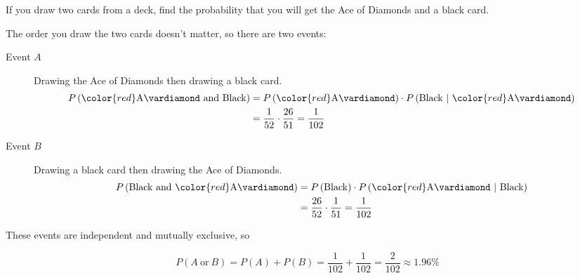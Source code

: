 \documentclass{beamer}
\newcommand{\suitdiamond}[1][]{{\color{red}\text{#1}\vardiamond}}
\newcommand{\prob}[1]{P\left(#1\right)}
\newcommand{\condprob}[2]{\prob{#1~\middle|~#2}}
\begin{document}
\begin{frame}
\begin{example}
If you draw two cards from a deck, find the probability that you will get the Ace of Diamonds and a black card.\pause

\vspace{1mm}
The order you draw the two cards doesn't matter, so there are two events:\pause
\begin{description}
\item[Event $A$] Drawing the Ace of Diamonds then drawing a black card.
\begin{equation*}
\begin{aligned}
\prob{\suitdiamond[A]~\text{and Black}} &= \prob{\suitdiamond[A]}\cdot\condprob{\text{Black}}{\suitdiamond[A]}\\
&= \dfrac{1}{52}\cdot\dfrac{26}{51} = \dfrac{1}{102}
\end{aligned}
\end{equation*}\pause

\vspace{-4mm}
\item[Event $B$] Drawing a black card then drawing the Ace of Diamonds.
\begin{equation*}
\begin{aligned}
\prob{\text{Black and}~\suitdiamond[A]} &= \prob{\text{Black}}\cdot\condprob{\suitdiamond[A]}{\text{Black}} \\
&= \dfrac{26}{52}\cdot\dfrac{1}{51}=\dfrac{1}{102}
\end{aligned}
\end{equation*}\pause
\end{description}

\vspace{-4mm}
These events are independent and mutually exclusive, so 

\vspace{-2.5mm}
\begin{equation*}
\prob{A~\text{or}~B} = \prob{A}+\prob{B} = \dfrac{1}{102}+\dfrac{1}{102} = \dfrac{2}{102} \approx 1.96\%
\end{equation*}
\end{example}
\end{frame}
\end{document}
